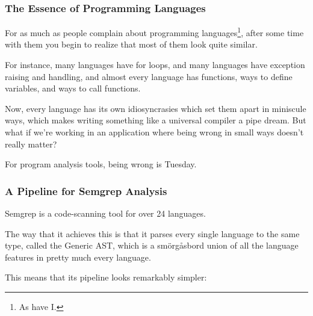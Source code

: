 \documentclass[aspectratio=169, handout]{beamer}
\begin{document}
\begin{frame}[fragile]
  \frametitle{The Essence of Programming Languages}

  For as much as people complain about programming languages\footnote{As have I.},
  after some time with them you begin to realize that most of them look quite similar.

  \pause
  \vspace{\fill}

  For instance, many languages have for loops, and many languages have exception
  raising and handling, and almost every language has functions, ways to define
  variables, and ways to call functions.

  \pause
  \vspace{\fill}

  Now, every language has its own idiosyncrasies which set them apart in miniscule ways,
  which makes writing something like a universal compiler a pipe dream. But what
  if we're working in an application where being wrong in small ways doesn't really
  matter?

  \pause
  \vspace{\fill}

  For program analysis tools, being wrong is Tuesday.
\end{frame}

\begin{frame}[fragile]
  \frametitle{A Pipeline for Semgrep Analysis}

  Semgrep is a code-scanning tool for over 24 languages.

  \pause
  \vspace{\fill}

  The way that it achieves this is that it parses every single language to the
  same type, called the Generic AST, which is a smörgåsbord union of all
  the language features in pretty much every language.

  \pause
  \vspace{\fill}

  This means that its pipeline looks remarkably simpler:

  \begin{center}
  \end{center}
\end{frame}
\end{document}
